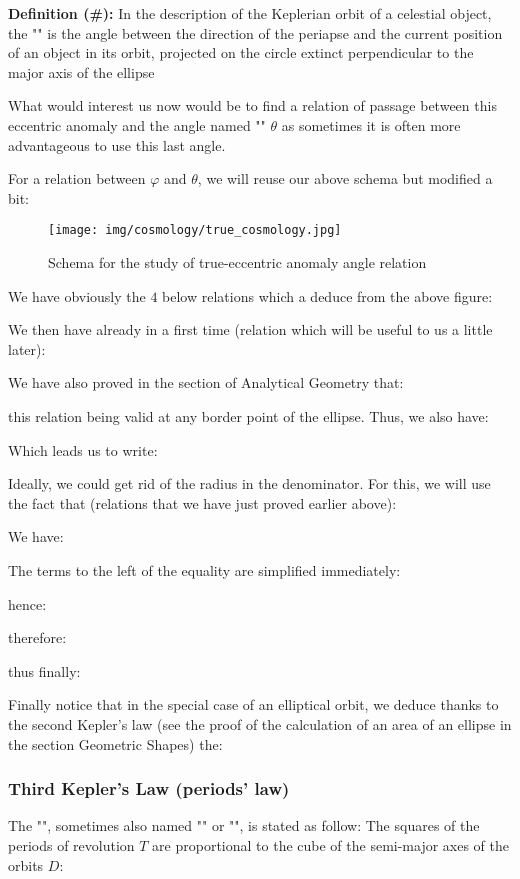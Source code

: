 	\textbf{Definition (\#\mydef):} In the description of the Keplerian orbit of a celestial object, the "" is the angle between the direction of the periapse and the current position of an object in its orbit, projected on the circle extinct perpendicular to the major axis of the ellipse

	What would interest us now would be to find a relation of passage between this eccentric anomaly and the angle named "" $\theta$ as sometimes it is often more advantageous to use this last angle.

	For a relation between $\varphi$ and $\theta$, we will reuse our above schema but modified a bit:
	\begin{figure}[H]
		\begin{center}
		\texttt{[image: img/cosmology/true\_cosmology.jpg]}
		\end{center}	
		\caption{Schema for the study of true-eccentric anomaly angle relation}
	\end{figure}
	We have obviously the $4$ below relations which a deduce from the above figure:
	
	We then have already in a first time (relation which will be useful to us a little later):
	
 	We have also proved in the section of Analytical Geometry that:
	
	this relation being valid at any border point of the ellipse. Thus, we also have:
	
 	Which leads us to write:
	
	Ideally, we could get rid of the radius in the denominator. For this, we will use the fact that (relations that we have just proved earlier above):
	
	We have:
	
 	The terms to the left of the equality are simplified immediately:
	
	hence:
	
 	therefore:
	
	thus finally:
	
	Finally notice that in the special case of an elliptical orbit, we deduce thanks to the second Kepler's law (see the proof of the calculation of an area of an ellipse in the section Geometric Shapes) the:
	
	\pagebreak
	\subsubsection{Third Kepler's Law (periods' law)} 
	The "", sometimes also named  "" or "", is stated as follow: The squares of the periods of revolution $T$ are proportional to the cube of the semi-major axes of the orbits $D$:
	
